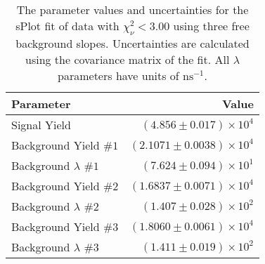 
\begin{table}[ht]
    \begin{center}
        \begin{tabular}{lr}\toprule
            Parameter & Value \\\midrule
            Signal Yield & $(4.856 \pm 0.017) \times 10^{4}$ \\
            Background Yield $\#1$ & $(2.1071 \pm 0.0038) \times 10^{4}$ \\
            Background $\lambda$ $\#1$ & $(7.624 \pm 0.094) \times 10^{1}$ \\
            Background Yield $\#2$ & $(1.6837 \pm 0.0071) \times 10^{4}$ \\
            Background $\lambda$ $\#2$ & $(1.407 \pm 0.028) \times 10^{2}$ \\
            Background Yield $\#3$ & $(1.8060 \pm 0.0061) \times 10^{4}$ \\
            Background $\lambda$ $\#3$ & $(1.411 \pm 0.019) \times 10^{2}$ \\\bottomrule
        \end{tabular}
        \caption{The parameter values and uncertainties for the sPlot fit of data with $\chi^2_\nu < 3.00$ using three free background slopes. Uncertainties are calculated using the covariance matrix of the fit. All $\lambda$ parameters have units of $\si{\nano\second}^{-1}$.}\label{tab:splot-fit-results-chisqdof-3.00-free-3}
    \end{center}
\end{table}
